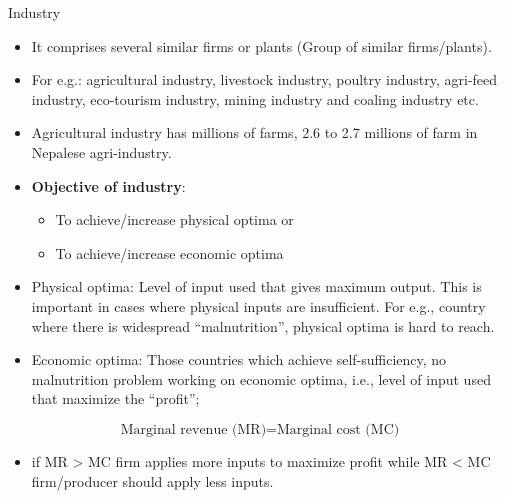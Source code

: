 \documentclass[12pt,ignorenonframetext,aspectratio=169]{beamer}
\providecommand{\tightlist}{%
  \setlength{\itemsep}{0pt}\setlength{\parskip}{0pt}}
\begin{document}
\begin{frame}{Industry}
\protect\hypertarget{industry}{}
\begin{itemize}
\tightlist
\item
  It comprises several similar firms or plants (Group of similar
  firms/plants).
\item
  For e.g.: agricultural industry, livestock industry, poultry industry,
  agri-feed industry, eco-tourism industry, mining industry and coaling
  industry etc.
\item
  Agricultural industry has millions of farms, 2.6 to 2.7 millions of
  farm in Nepalese agri-industry.
\item
  \textbf{Objective of industry}:

  \begin{itemize}
  \tightlist
  \item
    To achieve/increase physical optima or
  \item
    To achieve/increase economic optima
  \end{itemize}
\end{itemize}
\end{frame}

\begin{frame}{}
\protect\hypertarget{section-3}{}
\begin{itemize}
\tightlist
\item
  Physical optima: Level of input used that gives maximum output. This
  is important in cases where physical inputs are insufficient. For
  e.g., country where there is widespread ``malnutrition'', physical
  optima is hard to reach.
\item
  Economic optima: Those countries which achieve self-sufficiency, no
  malnutrition problem working on economic optima, i.e., level of input
  used that maximize the ``profit'';
\end{itemize}

\[
\textrm{Marginal revenue (MR)} = \textrm{Marginal cost (MC)}
\]

\begin{itemize}
\tightlist
\item
  if MR \textgreater{} MC firm applies more inputs to maximize profit
  while MR \textless{} MC firm/producer should apply less inputs.
\end{itemize}
\end{frame}
\end{document}
